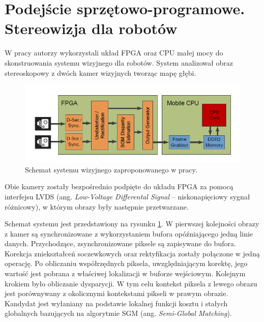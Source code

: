 
\section{Podejście sprzętowo-programowe. Stereowizja dla robotów }

W pracy \cite{honegger2014real} autorzy wykorzystali układ FPGA oraz CPU małej mocy do skonstruowania systemu wizyjnego dla robotów. 
System analizował obraz stereoskopowy z dwóch kamer wizyjnych tworząc mapę głębi. 
\begin{figure}[h]
    \centering
    \includegraphics[width=1\textwidth]{images/honegger2014real_Fig1}
    \caption{Schemat systemu wizyjnego zaproponowanego w pracy\cite{honegger2014real}.}
    \label{fig:honegger2014real_Fig1}
\end{figure}
Obie kamery zostały bezpośrednio podpięte do układu FPGA za pomocą interfejsu LVDS (ang. \textit{Low-Voltage Differental Signal} – niskonapięciowy sygnał różnicowy), w którym obrazy były następnie przetwarzane. 


Schemat systemu jest przedstawiony na rysunku \ref{fig:honegger2014real_Fig1}. W pierwszej kolejności obrazy z kamer są synchronizowane z wykorzystaniem bufora opóźniającego jedną linie danych. 
 Przychodzące, zsynchronizowane piksele są zapisywane do bufora. Korekcja zniekształceń soczewkowych oraz rektyfikacja zostały połączone w jedną operację. Po obliczaniu współrzędnych piksela, uwzględniającym korektę, jego wartość jest pobrana z właściwej lokalizacji w buforze wejściowym. Kolejnym krokiem było obliczanie dysparycji. W tym celu kontekst piksela z lewego obrazu jest porównywany z okolicznymi kontekstami pikseli w prawym obrazie. Kandydat jest wyłaniany na podstawie lokalnej funkcji kosztu i stałych globalnych bazujących na algorytmie SGM (ang. \textit{Semi-Global Matching}). 

